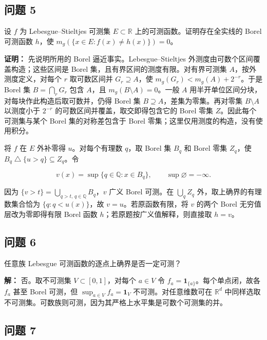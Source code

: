 \documentclass[11pt,a4paper]{article}
\begin{document}
\subsection{问题 5}\label{ux95eeux9898-5}

设 \(f\) 为 Lebesgue--Stieltjes 可测集 \(E\subset\mathbb R\)
上的可测函数。证明存在全实线的 Borel 可测函数 \(h\)，使
\(m_g(\{x\in E:f(x)\ne h(x)\})=0\)。

\textbf{证明：} 先说明所用的 Borel 逼近事实。Lebesgue--Stieltjes
外测度由可数个区间覆盖构造；这些区间是 Borel
集，且有界区间的测度有限。对有界可测集 \(A\)，按外测度定义，对每个 \(r\)
取可数区间并 \(G_r\supseteq A\)，使 \(m_g(G_r)<m_g(A)+2^{-r}\)。于是
Borel 集 \(B=\bigcap_rG_r\) 包含 \(A\)，且 \(m_g(B\setminus A)=0\)。一般
\(A\) 用半开单位区间分块，对每块作此构造后取可数并，仍得 Borel 集
\(B\supseteq A\)，差集为零集。再对零集 \(B\setminus A\) 以测度小于
\(2^{-r}\) 的可数区间并覆盖，取交即得包含它的 Borel 零集
\(Z\)。因此每个可测集与某个 Borel 集的对称差包含于 Borel
零集；这里仅用测度的构造，没有使用积分。

将 \(f\) 在 \(E\) 外补零得 \(u\)。对每个有理数 \(q\)，取 Borel 集
\(B_q\) 和 Borel 零集 \(Z_q\)，使
\(B_q\mathbin\triangle\{u>q\}\subseteq Z_q\)。令

\begin{equation*}v(x)=\sup\{q\in\mathbb Q:x\in B_q\},\qquad\sup\varnothing=-\infty.\end{equation*}

因为 \(\{v>t\}=\bigcup_{q>t,\,q\in\mathbb Q}B_q\)，\(v\) 广义 Borel
可测。在 \(\bigcup_qZ_q\) 外，取上确界的有理数集合恰为
\(\{q:q<u(x)\}\)，故 \(v=u\)。若原函数有限，将 \(v\) 的两个 Borel
无穷值层改为零即得有限 Borel 函数 \(h\)；若原题按广义值解释，则直接取
\(h=v\)。

\subsection{问题 6}\label{ux95eeux9898-6}

任意族 Lebesgue 可测函数的逐点上确界是否一定可测？

\textbf{解：} 否。取不可测集 \(V\subset[0,1]\)，对每个 \(a\in V\) 令
\(f_a=\mathbf1_{\{a\}}\)。每个单点闭，故各 \(f_a\) 甚至 Borel 可测，但
\(\sup_{a\in V}f_a=\mathbf1_V\) 不可测。对任意维数可在 \(\mathbb R^d\)
中同样选取不可测集。可数族则可测，因为其严格上水平集是可数个可测集的并。

\subsection{问题 7}\label{ux95eeux9898-7}
\end{document}
